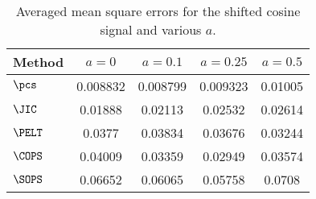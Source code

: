 \begin{table}[ht]
\centering
\begin{tabular}{lcccc}
  \hline
Method & $a = 0$ & $a = 0.1$ & $a = 0.25$ & $a = 0.5$ \\ 
  \hline
$\pcs$ & 0.008832 & 0.008799 & 0.009323 & 0.01005 \\ 
  $\JIC$ & 0.01888 & 0.02113 & 0.02532 & 0.02614 \\ 
  $\PELT$ & 0.0377 & 0.03834 & 0.03676 & 0.03244 \\ 
  $\COPS$ & 0.04009 & 0.03359 & 0.02949 & 0.03574 \\ 
  $\SOPS$ & 0.06652 & 0.06065 & 0.05758 & 0.0708 \\ 
   \hline
\end{tabular}
\caption{Averaged mean square errors for the shifted cosine signal and various $a$.} 
\label{tab:aMSErobustness}
\end{table}
